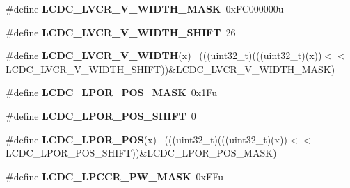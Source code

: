 \begin{DoxyCompactItemize}
\item 
\hypertarget{group___l_c_d_c___register___masks_ga4ec118f56684ff3724cf8664892b5a82}{}\#define {\bfseries L\+C\+D\+C\+\_\+\+L\+V\+C\+R\+\_\+\+V\+\_\+\+W\+I\+D\+T\+H\+\_\+\+M\+A\+S\+K}~0x\+F\+C000000u\label{group___l_c_d_c___register___masks_ga4ec118f56684ff3724cf8664892b5a82}

\item 
\hypertarget{group___l_c_d_c___register___masks_gafe91352bbee7f9ba98bdb4ef98f858ce}{}\#define {\bfseries L\+C\+D\+C\+\_\+\+L\+V\+C\+R\+\_\+\+V\+\_\+\+W\+I\+D\+T\+H\+\_\+\+S\+H\+I\+F\+T}~26\label{group___l_c_d_c___register___masks_gafe91352bbee7f9ba98bdb4ef98f858ce}

\item 
\hypertarget{group___l_c_d_c___register___masks_ga5b6bbd2598bc189539a2f86a7edbbe93}{}\#define {\bfseries L\+C\+D\+C\+\_\+\+L\+V\+C\+R\+\_\+\+V\+\_\+\+W\+I\+D\+T\+H}(x)                                      ~(((uint32\+\_\+t)(((uint32\+\_\+t)(x))$<$$<$L\+C\+D\+C\+\_\+\+L\+V\+C\+R\+\_\+\+V\+\_\+\+W\+I\+D\+T\+H\+\_\+\+S\+H\+I\+F\+T))\&L\+C\+D\+C\+\_\+\+L\+V\+C\+R\+\_\+\+V\+\_\+\+W\+I\+D\+T\+H\+\_\+\+M\+A\+S\+K)\label{group___l_c_d_c___register___masks_ga5b6bbd2598bc189539a2f86a7edbbe93}

\item 
\hypertarget{group___l_c_d_c___register___masks_ga0322e7bd6bb1956964cdbb4ff3ab77e1}{}\#define {\bfseries L\+C\+D\+C\+\_\+\+L\+P\+O\+R\+\_\+\+P\+O\+S\+\_\+\+M\+A\+S\+K}~0x1\+Fu\label{group___l_c_d_c___register___masks_ga0322e7bd6bb1956964cdbb4ff3ab77e1}

\item 
\hypertarget{group___l_c_d_c___register___masks_ga1d527278d92e98f1f51e21d6be8da527}{}\#define {\bfseries L\+C\+D\+C\+\_\+\+L\+P\+O\+R\+\_\+\+P\+O\+S\+\_\+\+S\+H\+I\+F\+T}~0\label{group___l_c_d_c___register___masks_ga1d527278d92e98f1f51e21d6be8da527}

\item 
\hypertarget{group___l_c_d_c___register___masks_ga536f8c7ad1f56f7b255c8461ae4ff2ec}{}\#define {\bfseries L\+C\+D\+C\+\_\+\+L\+P\+O\+R\+\_\+\+P\+O\+S}(x)                                              ~(((uint32\+\_\+t)(((uint32\+\_\+t)(x))$<$$<$L\+C\+D\+C\+\_\+\+L\+P\+O\+R\+\_\+\+P\+O\+S\+\_\+\+S\+H\+I\+F\+T))\&L\+C\+D\+C\+\_\+\+L\+P\+O\+R\+\_\+\+P\+O\+S\+\_\+\+M\+A\+S\+K)\label{group___l_c_d_c___register___masks_ga536f8c7ad1f56f7b255c8461ae4ff2ec}

\item 
\hypertarget{group___l_c_d_c___register___masks_ga5f96d1513331f408395a92f1d6890f32}{}\#define {\bfseries L\+C\+D\+C\+\_\+\+L\+P\+C\+C\+R\+\_\+\+P\+W\+\_\+\+M\+A\+S\+K}~0x\+F\+Fu\label{group___l_c_d_c___register___masks_ga5f96d1513331f408395a92f1d6890f32}


\end{DoxyCompactItemize}
